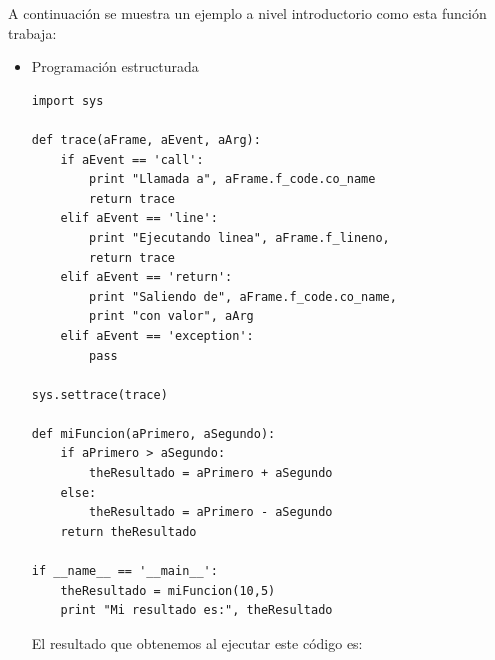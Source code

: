 \documentclass[12pt,legalpaper]{report}
\begin{document}
A continuación se muestra un ejemplo a nivel introductorio como esta función trabaja:

\begin{itemize}
	\item{Programación estructurada}

\begin{singlespace}
\begin{lstlisting}[style=Python]
import sys

def trace(aFrame, aEvent, aArg):
    if aEvent == 'call':
        print "Llamada a", aFrame.f_code.co_name
        return trace
    elif aEvent == 'line':
        print "Ejecutando linea", aFrame.f_lineno, 
        return trace
    elif aEvent == 'return':
        print "Saliendo de", aFrame.f_code.co_name, 
        print "con valor", aArg
    elif aEvent == 'exception':
        pass

sys.settrace(trace)

def miFuncion(aPrimero, aSegundo):
    if aPrimero > aSegundo:
        theResultado = aPrimero + aSegundo
    else:
        theResultado = aPrimero - aSegundo
    return theResultado

if __name__ == '__main__':
    theResultado = miFuncion(10,5)
    print "Mi resultado es:", theResultado
\end{lstlisting}
\end{singlespace}

El resultado que obtenemos al ejecutar este código es:
\end{itemize}
\end{document}
